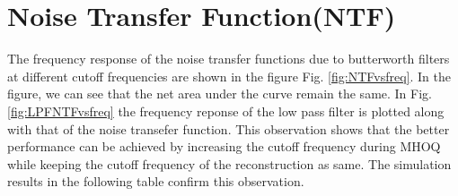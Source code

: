 \documentclass[a4paper]{article}
\begin{document}




\section{Noise Transfer Function(NTF)}
The frequency response of the noise transfer functions due to butterworth filters at different cutoff frequencies are shown in the figure Fig. \ref{fig:NTFvsfreq}. In the figure, we can see that the net area under the curve remain the same.   In Fig. \ref{fig:LPFNTFvsfreq} the frequency reponse of the low pass filter is plotted along with that of the noise transefer function. This observation shows that the better performance can be achieved by increasing the cutoff frequency during MHOQ while keeping the cutoff frequency of the reconstruction as same. The simulation results in the following table confirm this observation. 
\end{document}
